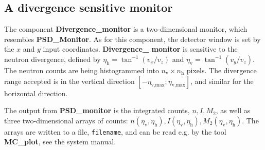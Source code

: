 
\subsection*{A divergence sensitive monitor}
\label{s:div-monitor}

The component \textbf{Divergence\_monitor} is a two-dimensional monitor,
which resembles \textbf{PSD\_Monitor}. As for this component,
the detector window is set
by the $x$ and $y$ input coordinates.
\textbf{Divergence\_ monitor} is sensitive to the neutron divergence,
defined by
$\eta_\textrm{h} = \tan^{-1}(v_x/v_z)$ and $\eta_\textrm{v} = \tan^{-1}(v_y/v_z)$.
The neutron counts are being histogrammed
into $n_\textrm{v} \times n_\textrm{h}$ pixels. 
The divergence range accepted is in the vertical direction
$[-\eta_\textrm{v,max}; \eta_\textrm{v,max}]$, and similar for the horizontal
direction.

The output from \textbf{PSD\_monitor} is the integrated counts, $n, I, M_2$,
as well as
three two-dimensional arrays of counts: $n(\eta_\textrm{v},\eta_\textrm{h}),
I(\eta_\textrm{v},\eta_\textrm{h}), M_2(\eta_\textrm{v},\eta_\textrm{h})$.
The arrays are written to a file, \verb+filename+, 
and can be read e.g. by the tool \textbf{MC\_plot}, see the system manual.
